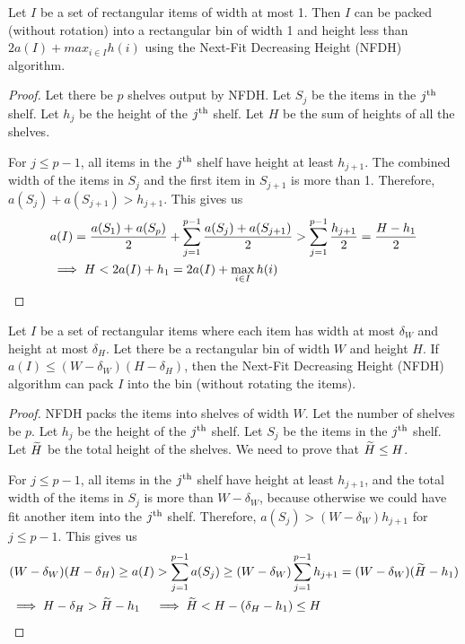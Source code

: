 \begin{lemma}
\label{thm:nfdh-strip}
Let $I$ be a set of rectangular items of width at most 1.
Then $I$ can be packed (without rotation) into a rectangular bin of width 1
and height less than $2a(I) + max_{i \in I} h(i)$
using the Next-Fit Decreasing Height (NFDH) algorithm.
\end{lemma}
\begin{proof}
Let there be $p$ shelves output by NFDH.
Let $S_j$ be the items in the $j^{\textrm{th}}$ shelf.
Let $h_j$ be the height of the $j^{\textrm{th}}$ shelf.
Let $H$ be the sum of heights of all the shelves.

For $j \le p-1$, all items in the $j^{\textrm{th}}$ shelf have height at least $h_{j+1}$.
The combined width of the items in $S_j$ and the first item in $S_{j+1}$ is more than 1.
Therefore, $a(S_j) + a(S_{j+1}) > h_{j+1}$. This gives us
\begin{align*}
& a(I) = \frac{a(S_1) + a(S_p)}{2} + \sum_{j=1}^{p-1} \frac{a(S_j) + a(S_{j+1})}{2}
> \sum_{j=1}^{p-1} \frac{h_{j+1}}{2} = \frac{H-h_1}{2}
\\ &\implies H < 2a(I) + h_1 = 2a(I) + \max_{i \in I} h(i)
\qedhere \end{align*}
\end{proof}

\begin{lemma}
\label{thm:nfdh-small}
Let $I$ be a set of rectangular items where each item has width at most $\delta_W$
and height at most $\delta_H$. Let there be a rectangular bin of width $W$ and height $H$.
If $a(I) \le (W - \delta_W)(H - \delta_H)$, then the Next-Fit Decreasing Height (NFDH)
algorithm can pack $I$ into the bin (without rotating the items).
\end{lemma}
\begin{proof}
NFDH packs the items into shelves of width $W$.
Let the number of shelves be $p$.
Let $h_j$ be the height of the $j^{\textrm{th}}$ shelf.
Let $S_j$ be the items in the $j^{\textrm{th}}$ shelf.
Let $\widetilde{H}$ be the total height of the shelves.
We need to prove that $\widetilde{H} \le H$.

For $j \le p-1$, all items in the $j^{\textrm{th}}$ shelf have height at least $h_{j+1}$,
and the total width of the items in $S_j$ is more than $W-\delta_W$,
because otherwise we could have fit another item into the $j^{\textrm{th}}$ shelf.
Therefore, $a(S_j) > (W-\delta_W)h_{j+1}$ for $j \le p-1$. This gives us
\begin{align*}
& (W - \delta_W)(H - \delta_H) \ge a(I) > \sum_{j=1}^{p-1} a(S_j)
\ge (W-\delta_W)\sum_{j=1}^{p-1} h_{j+1}
= (W-\delta_W)(\widetilde{H} - h_1)
\\ &\implies H - \delta_H > \widetilde{H} - h_1
\quad\implies \widetilde{H} < H - (\delta_H - h_1) \le H
\qedhere \end{align*}
\end{proof}

